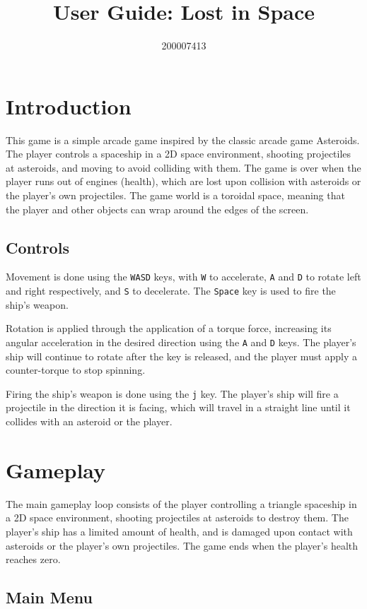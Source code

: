 \documentclass[12pt, a4paper]{article}
\title{User Guide: Lost in Space}
\author{200007413}
\date{}
\begin{document}
{\bfseries\huge\thetitle}

{\large\theauthor}

\section{Introduction}

This game is a simple arcade game inspired by the classic arcade game Asteroids. The player controls a spaceship in a 2D space environment, shooting projectiles at asteroids, and moving to avoid colliding with them. The game is over when the player runs out of engines (health), which are lost upon collision with asteroids or the player's own projectiles. The game world is a toroidal space, meaning that the player and other objects can wrap around the edges of the screen.

\subsection{Controls}

Movement is done using the \texttt{WASD} keys, with \texttt{W} to accelerate, \texttt{A} and \texttt{D} to rotate left and right respectively, and \texttt{S} to decelerate. The \texttt{Space} key is used to fire the ship's weapon.

Rotation is applied through the application of a torque force, increasing its angular acceleration in the desired direction using the \texttt{A} and \texttt{D} keys. The player's ship will continue to rotate after the key is released, and the player must apply a counter-torque to stop spinning.

Firing the ship's weapon is done using the \texttt{j} key. The player's ship will fire a projectile in the direction it is facing, which will travel in a straight line until it collides with an asteroid or the player.

\section{Gameplay}

The main gameplay loop consists of the player controlling a triangle spaceship in a 2D space environment, shooting projectiles at asteroids to destroy them. The player's ship has a limited amount of health, and is damaged upon contact with asteroids or the player's own projectiles. The game ends when the player's health reaches zero.

\subsection{Main Menu}
\end{document}
